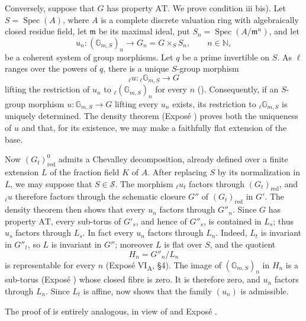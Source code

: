 Conversely, suppose that \(G\) has property \(\mathrm{AT}\). We prove
condition  \textup{iii bis)}. Let \(S=\operatorname{Spec}(A)\),
where \(A\) is a complete discrete valuation ring with algebraically
closed residue field, let \(\mathfrak m\) be its maximal ideal, put
\(S_n=\operatorname{Spec}(A/\mathfrak m^n)\), and let
\[
 u_n:(\mathbb G_{m,S})_n\longrightarrow
 G_n=G\times_S S_n,\qquad n\in\mathbb N,
\]
be a coherent system of group morphisms. Let \(q\) be a prime
invertible on \(S\). As \(\ell\) ranges over the powers of \(q\),
there is a unique \(S\)-group morphism
\[
 {}_\ell u:{}_\ell\mathbb G_{m,S}\longrightarrow G
\]
lifting the restriction of \(u_n\) to
\({}_\ell(\mathbb G_{m,S})_n\) for every \(n\)
(). Consequently, if an \(S\)-group morphism
\(u:\mathbb G_{m,S}\to G\) lifting every \(u_n\) exists, its
restriction to \({}_\ell\mathbb G_{m,S}\) is uniquely determined.
The density theorem (Exposé ) proves both the uniqueness of
\(u\) and that, for its existence, we may make a faithfully flat
extension of the base.

Now \((G_t)^0_{\mathrm{red}}\) admits a Chevalley decomposition,
already defined over a finite extension \(L\) of the fraction field
\(K\) of \(A\). After replacing \(S\) by its normalization in \(L\),
we may suppose that \(S\in\mathcal S\). The morphism
\({}_\ell u_t\) factors through \((G_t)_{\mathrm{red}}\), and
\({}_\ell u\) therefore factors through the schematic closure
\(G''\) of \((G_t)_{\mathrm{red}}\) in \(G'\). The density theorem
then shows that every \(u_n\) factors through \(G''_n\).
Since \(G\) has property \(\mathrm{AT}\), every sub-torus of \(G'_s\),
and hence of \(G''_s\), is contained in \(L_s\); thus \(u_s\)
factors through \(L_s\). In fact every \(u_n\) factors through
\(L_n\). Indeed, \(L_t\) is invariant in \(G''_t\), so \(L\) is
invariant in \(G''\); moreover \(L\) is flat over \(S\), and the
quotient
\[
  H_n=G''_n/L_n
\]
is representable for every \(n\) (Exposé VI\textsubscript{A},
\S4). The image of \((\mathbb G_{m,S})_n\) in \(H_n\) is a
sub-torus (Exposé ) whose closed fibre is zero. It is therefore
zero, and \(u_n\) factors through \(L_n\). Since \(L_t\) is affine,
 now shows that the family \((u_n)\) is admissible.

The proof of  is entirely analogous, in view of
 and Exposé .

